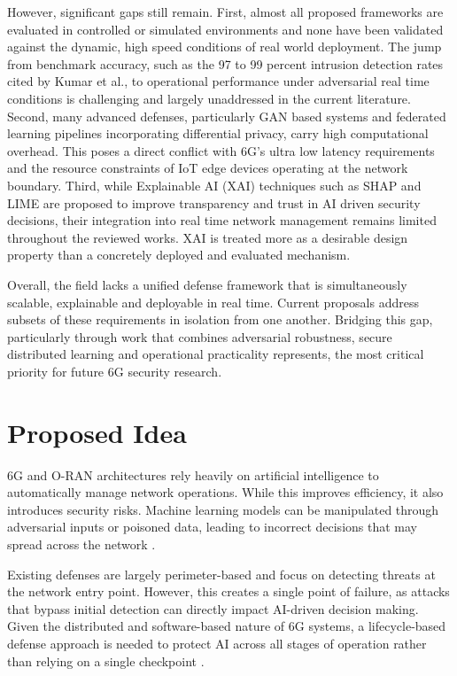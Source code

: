 \documentclass[letterpaper]{article} %
\begin{document}
However, significant gaps still remain. First, almost all proposed frameworks are evaluated in controlled or simulated environments and none have been validated against the dynamic, high speed conditions of real world deployment. The jump from benchmark accuracy, such as the 97 to 99 percent intrusion detection rates cited by Kumar et al., to operational performance under adversarial real time conditions is challenging and largely unaddressed in the current literature. Second, many advanced defenses, particularly GAN based systems and federated learning pipelines incorporating differential privacy, carry high computational overhead. This poses a direct conflict with 6G's ultra low latency requirements and the resource constraints of IoT edge devices operating at the network boundary. Third, while Explainable AI (XAI) techniques such as SHAP and LIME are proposed to improve transparency and trust in AI driven security decisions, their integration into real time network management remains limited throughout the reviewed works. XAI is treated more as a desirable design property than a concretely deployed and evaluated mechanism.

Overall, the field lacks a unified defense framework that is simultaneously scalable, explainable and deployable in real time. Current proposals address subsets of these requirements in isolation from one another. Bridging this gap, particularly through work that combines adversarial robustness, secure distributed learning and operational practicality represents, the most critical priority for future 6G security research.




\section{Proposed Idea}


6G and O-RAN architectures rely heavily on artificial intelligence to automatically manage network operations. While this improves efficiency, it also introduces security risks. Machine learning models can be manipulated through adversarial inputs or poisoned data, leading to incorrect decisions that may spread across the network \cite{Catak_Catak_Moldsvor_2021, Chen_Zhang_Zhang_Wang_Liu_2021}.

Existing defenses are largely perimeter-based and focus on detecting threats at the network entry point. However, this creates a single point of failure, as attacks that bypass initial detection can directly impact AI-driven decision making. Given the distributed and software-based nature of 6G systems, a lifecycle-based defense approach is needed to protect AI across all stages of operation rather than relying on a single checkpoint \cite{Chen_Zhang_Zhang_Wang_Liu_2021}.
\end{document}
